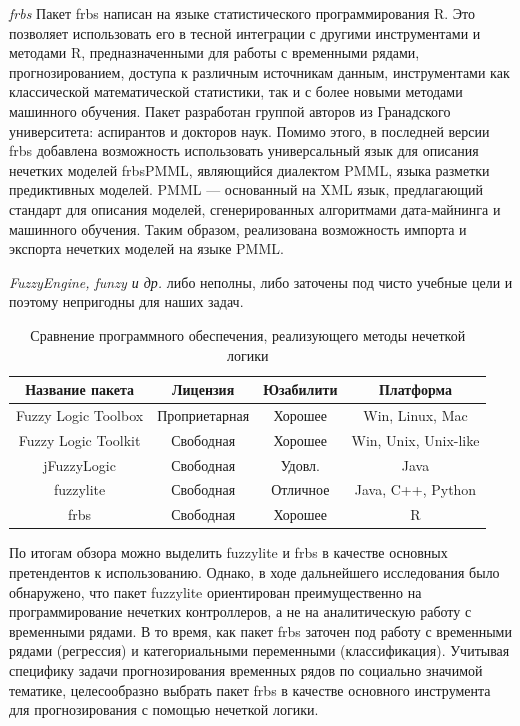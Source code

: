 \textit{frbs} Пакет frbs написан на языке статистического программирования R.
Это позволяет использовать его в тесной интеграции с другими инструментами и
методами R, предназначенными для работы с временными рядами, прогнозированием,
доступа к различным источникам данным, инструментами как классической
математической статистики, так и с более новыми методами машинного обучения.
Пакет разработан группой авторов из Гранадского университета: аспирантов и
докторов наук. Помимо этого, в последней версии frbs добавлена возможность
использовать универсальный язык для описания нечетких моделей frbsPMML,
являющийся диалектом PMML, языка разметки предиктивных моделей. PMML ---
основанный на XML язык, предлагающий стандарт для описания моделей,
сгенерированных алгоритмами дата-майнинга и машинного обучения. Таким образом,
реализована возможность импорта и экспорта нечетких моделей на языке PMML.

\textit{FuzzyEngine, funzy и др.} либо неполны, либо заточены под чисто учебные цели и поэтому непригодны для наших задач. 

\begin{table}[bhtp]
    \caption{Сравнение программного обеспечения, реализующего методы нечеткой
        логики}
	\begin{center}
        \begin{tabular}{ | c | c | c | c |}
			\hline
            Название пакета & Лицензия & Юзабилити & Платформа \\
			\hline
            Fuzzy Logic Toolbox & Проприетарная & Хорошее &
            Win, Linux, Mac\\
			\hline
            Fuzzy Logic Toolkit & Свободная & Хорошее &
            Win, Unix, Unix-like\\
			\hline
            jFuzzyLogic & Свободная & Удовл. &
            Java\\
			\hline
            fuzzylite & Свободная & Отличное &
            Java, C++, Python\\
			\hline
            frbs & Свободная & Хорошее &
            R\\
			\hline
		\end{tabular}		
	\end{center}
    \label{table:soft_comparison}	
\end{table}

По итогам обзора можно выделить fuzzylite и frbs в качестве основных
претендентов к использованию. Однако, в ходе дальнейшего исследования было
обнаружено, что пакет fuzzylite ориентирован преимущественно на программирование
нечетких контроллеров, а не на аналитическую работу с временными рядами. В то
время, как пакет frbs заточен под работу с временными рядами (регрессия) и
категориальными переменными (классификация). Учитывая специфику задачи
прогнозирования временных рядов по социально значимой тематике, целесообразно
выбрать пакет frbs в качестве основного инструмента для прогнозирования с
помощью нечеткой логики.

